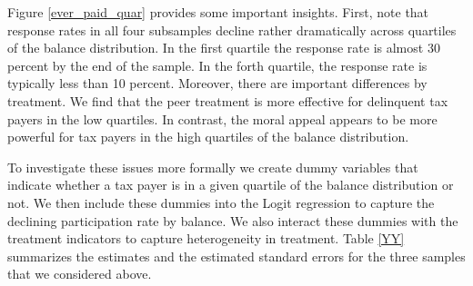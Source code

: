 \documentclass[12pt,titlepage]{article}
\begin{document}
Figure \ref{ever_paid_quar} provides some important insights. First,
note that response rates in all four subsamples decline rather
dramatically across quartiles of the balance distribution. In the
first quartile the response rate is almost 30 percent by the end of
the sample. In the forth quartile, the response rate is typically
less than 10 percent.  Moreover, there are important differences by
treatment.  We find that the peer treatment is more effective for
delinquent tax payers in the low quartiles. In contrast, the moral
appeal appears to be more powerful for tax payers in the high
quartiles of the balance distribution.

To investigate these issues more formally we create dummy variables
that indicate whether a tax payer is in a given quartile of the balance
distribution or not. We then include these dummies into the Logit
regression to capture the declining participation rate by balance. We
also interact these dummies with the treatment indicators to capture
heterogeneity in treatment. Table \ref{YY} summarizes the estimates
and the estimated standard errors for the three samples that we
considered above.
\end{document}
